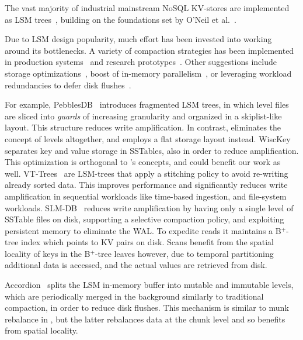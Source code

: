

The vast majority of industrial mainstream NoSQL KV-stores are  implemented as LSM trees~\cite{hbase, 
RocksDB, scylladb, Bigtable2008, cassandra2010}, building on the foundations set by O'Neil 
et al.~\cite{DBLP:journals/acta/ONeilCGO96, Muth1998}. 

Due to LSM design popularity, much effort has been invested into working around its bottlenecks.
A variety of compaction strategies has been implemented in production systems~\cite{CallaghanCompaction, 
ScyllaCompaction} and research prototypes~\cite{triad, PebblesDB, vttrees, slmdb}. Other suggestions include storage
optimizations~\cite{WiscKey, PebblesDB, vttrees, slmdb}, boost of in-memory parallelism~\cite{scylladb, clsm2015}, or leveraging 
 workload redundancies to defer disk flushes~\cite{triad, accordion}. 

For example, PebblesDB~\cite{PebblesDB} introduces fragmented LSM trees, in which level files are 
sliced into {\em guards\/} of increasing granularity and organized in a skiplist-like layout. This structure 
reduces write amplification. In contrast, \sys\/ eliminates the concept of levels altogether, 
and employs a flat storage layout instead. WiscKey~\cite{WiscKey} separates key and value storage 
in SSTables, also in order to reduce amplification. This optimization is orthogonal to \sys's concepts,
and could benefit our work as well. 
VT-Trees~\cite{vttrees} are LSM-trees that apply a stitching policy to avoid re-writing already sorted data. This improves performance and significantly reduces write amplification in sequential workloads like time-based ingestion, and file-system workloads. 
SLM-DB~\cite{slmdb} reduces write amplification by having only a single level of SSTable files on disk, supporting a selective compaction policy, and
exploiting persistent memory to eliminate the WAL. To expedite reads it maintains a B$^+$-tree index which points to KV pairs on disk. Scans benefit from the spatial locality of keys in the B$^+$-tree leaves however, due to temporal partitioning additional data is accessed, and the actual values are retrieved from disk.

Accordion~\cite{accordion} splits the LSM in-memory buffer into mutable 
and immutable levels, which are periodically merged in the background similarly to traditional compaction, 
in order to reduce disk flushes. This mechanism is similar to munk rebalance in \sys, 
but the latter rebalances data at the chunk level and so benefits from spatial locality.



